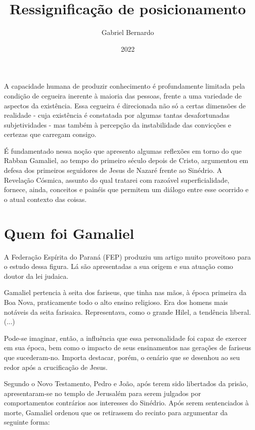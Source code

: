 \documentclass[12pt, oneside,twocolumns, a4paper, brazil]{abntex2}
\title{Ressignificação de posicionamento}
\date{2022}
\author{Gabriel Bernardo}
\begin{document}
\frenchspacing

\maketitle

\textual

A capacidade humana de produzir conhecimento é profundamente limitada pela condição de cegueira inerente à maioria das pessoas, frente a uma variedade de aspectos da existência. Essa cegueira é direcionada não só a certas dimensões de realidade - cuja existência é constatada por algumas tantas desafortunadas subjetividades - mas também à percepção da instabilidade das convicções e certezas que carregam consigo. \par
É fundamentado nessa noção que apresento algumas reflexões em torno do que Rabban Gamaliel, ao tempo do primeiro século depois de Cristo, argumentou em defesa dos primeiros seguidores de Jesus de Nazaré frente ao Sinédrio. A Revelação Cósmica, assunto do qual tratarei com razoável superficialidade, fornece, ainda, conceitos e painéis que permitem um diálogo entre esse ocorrido e o atual contexto das coisas.

\section*{Quem foi Gamaliel}

A Federação Espírita do Paraná (FEP) produziu um artigo\cite{artFEP} muito proveitoso para o estudo dessa figura. Lá são apresentadas a sua origem e sua atuação como doutor da lei judaica.

\begin{citacao}
Gamaliel pertencia à seita dos fariseus, que tinha nas mãos, à época primeira da Boa Nova, praticamente todo o alto ensino religioso. Era dos homens mais notáveis da seita farisaica. Representava, como o grande Hilel, a tendência liberal. (...)
\end{citacao}

Pode-se imaginar, então, a influência que essa personalidade foi capaz de exercer em sua época, bem como o impacto de seus ensinamentos nas gerações de fariseus que sucederam-no. Importa destacar, porém, o cenário que se desenhou ao seu redor após a crucificação de Jesus.\par
Segundo o Novo Testamento, Pedro e João, após terem sido libertados da prisão, apresentaram-se no templo de Jerusalém para serem julgados por comportamentos contrários aos interesses do Sinédrio. Após serem sentenciados à morte, Gamaliel ordenou que os retirassem do recinto para argumentar da seguinte forma: 
\end{document}
